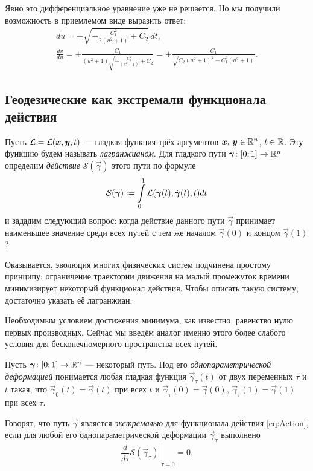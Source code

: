 \begin{solution}
	Явно это дифференциальное уравнение уже не решается. Но мы получили возможность в приемлемом виде выразить ответ:
	\begin{gather*}
		du = \pm\sqrt{-\frac{C_1^2}{2(u^2 + 1)} + C_2}\,dt,\\
		\frac{dv}{du} = \pm\frac{C_1}{(u^2 + 1)\sqrt{-\frac{C_1^2}{(u^2 + 1)} + C_2}} = \pm\frac{C_1}{\sqrt{C_2(u^2 + 1)^2 - C_1^2(u^2 + 1)}}.
	\end{gather*}
\end{solution}

\subsection{Геодезические как экстремали функционала действия}

Пусть $\mathcal{L} = \mathcal{L}(\boldsymbol{x}, \boldsymbol{y}, t)$ --- гладкая функция трёх аргументов $\boldsymbol{x},\,\boldsymbol{y} \in \mathbb{R}^n$, $t \in \mathbb{R}$. Эту функцию будем называть \textit{лагранжианом}. Для гладкого пути $\boldsymbol{\gamma}\colon [0; 1] \to \mathbb{R}^n$ определим \textit{действие} $\mathcal{S}(\vec{\gamma})$ этого пути по формуле
\begin{equation} \label{eq:Action}
	\mathcal{S}(\boldsymbol{\gamma}) \vcentcolon = \int\limits_0^1\mathcal{L}(\boldsymbol{\gamma}(t), \dot{\boldsymbol{\gamma}}(t), t)dt
\end{equation}
и зададим следующий вопрос: когда действие данного пути $\vec{\gamma}$ принимает наименьшее значение среди всех путей с тем же началом $\vec{\gamma}(0)$ и концом $\vec{\gamma}(1)$?

Оказывается, эволюция многих физических систем подчинена простому принципу: ограничение траектории движения на малый промежуток времени минимизирует некоторый функционал действия\footnotemark{}. Чтобы описать такую систему, достаточно указать её лагранжиан.


Необходимым условием достижения минимума, как известно, равенство нулю первых производных. Сейчас мы введём аналог именно этого более слабого условия для бесконечномерного пространства всех путей.

\begin{definition}
	Пусть $\boldsymbol{\gamma}\colon [0; 1] \to \mathbb{R}^n$ --- некоторый путь. Под его \textit{однопараметрической деформацией} понимается любая гладкая функция $\vec{\gamma}_\tau(t)$ от двух переменных $\tau$ и $t$ такая, что $\vec{\gamma}_0(t) = \vec{\gamma}(t)$ при всех $t$ и $\vec{\gamma}_\tau(0) = \vec{\gamma}(0)$, $\vec{\gamma}_\tau(1) = \vec{\gamma}(1)$ при всех $\tau$.

	Говорят, что путь $\vec{\gamma}$ является \textit{экстремалью} для функционала действия \eqref{eq:Action}, если для любой его однопараметрической деформации $\vec{\gamma}_\tau$ выполнено
	\[
		\left.\frac{d}{d\tau}\mathcal{S}(\vec{\gamma}_\tau)\right|_{\tau = 0} = 0.
	\]
\end{definition}

